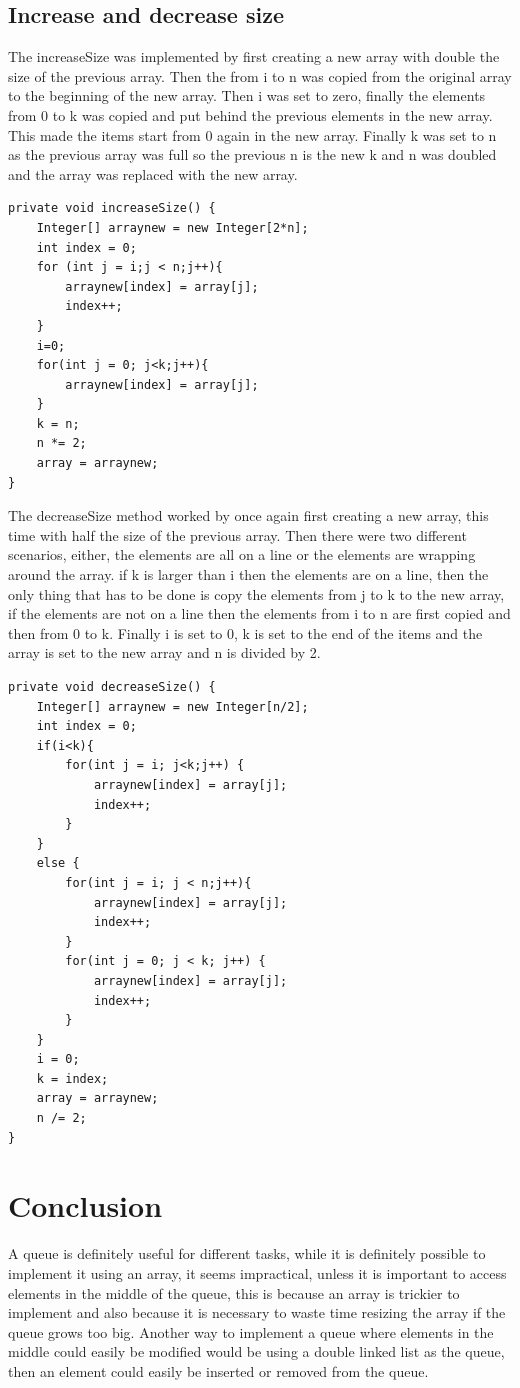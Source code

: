 \documentclass[a4paper,11pt]{article}
\begin{document}
\subsection*{Increase and decrease size}
The increaseSize was implemented by first creating a new array with double the size of the previous array. Then the from i to n was copied from the original array to the beginning of the new array. Then i was set to zero, finally the elements from 0 to k was copied and put behind the previous elements in the new array. This made the items start from 0 again in the new array. Finally k was set to n as the previous array was full so the previous n is the new k and 
n was doubled and the array was replaced with the new array.
\begin{verbatim}
private void increaseSize() {
    Integer[] arraynew = new Integer[2*n];
    int index = 0;
    for (int j = i;j < n;j++){
        arraynew[index] = array[j];
        index++;
    }
    i=0;
    for(int j = 0; j<k;j++){
        arraynew[index] = array[j];
    }
    k = n; 
    n *= 2;
    array = arraynew;
}
\end{verbatim}
The decreaseSize method worked by once again first creating a new array, this time with half the size of the previous array. Then there were two different scenarios, either, 
the elements are all on a line or the elements are wrapping around the array. if k is larger than i then the elements are on a line, then the only thing that has to be done is copy the elements from j to k to the new array, if the elements are not 
on a line then the elements from i to n are first copied and then from 0 to k. Finally i is set to 0, k is set to the end of the items and the array is set to the new array and n is divided by 2.
\begin{verbatim}
private void decreaseSize() {
    Integer[] arraynew = new Integer[n/2];
    int index = 0;
    if(i<k){
        for(int j = i; j<k;j++) {
            arraynew[index] = array[j];
            index++;
        }
    }
    else {
        for(int j = i; j < n;j++){
            arraynew[index] = array[j];
            index++;
        }  
        for(int j = 0; j < k; j++) {
            arraynew[index] = array[j];
            index++;
        }
    }
    i = 0;
    k = index;
    array = arraynew;
    n /= 2;
}
\end{verbatim}

\section*{Conclusion}
A queue is definitely useful for different tasks, while it is definitely possible to implement it using an array, it seems impractical, unless it is important to access elements in the middle of the queue, this is because an array is trickier to implement and also 
because it is necessary to waste time resizing the array if the queue grows too big. Another way to implement a queue where elements in the middle could easily be modified would be using a double linked list as the queue, then an element could easily be inserted or removed from the queue.
\end{document}
